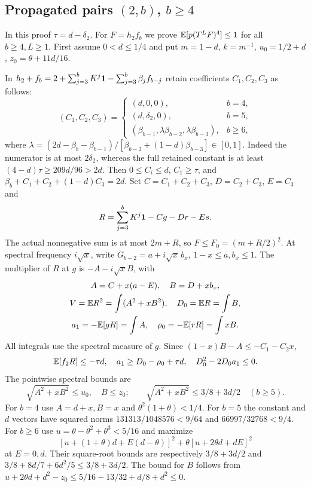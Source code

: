 \subsection[Propagated pairs (2,b), b >= 4]{Propagated pairs $(2,b)$, $b\ge4$}\label{loc:S25}\label{proof:Q4-C128}
In this proof $\tau=d-\delta_{2}$.
For $F=h_2f_b$ we prove $\mathbb E[p(T^LF)^4]\le1$ for all $b\ge4,L\ge1$.
First assume $0<d\le1/4$ and put
$m=1-d$, $k=m^{-1}$, $u_0=1/2+d$, $z_0=\theta+11d/16$.

In $h_2+f_b=2+\sum_{j=3}^bK^j\mathbf1-\sum_{j=3}^b\beta_jf_{b-j}$
retain coefficients $C_1,C_2,C_3$ as follows:
\[
 (C_1,C_2,C_3)=
 \begin{cases}(d,0,0),&b=4,\\(d,\delta_{2},0),&b=5,\\
 (\beta_{b-1},\lambda\beta_{b-2},\lambda\beta_{b-3}),&b\ge6,
 \end{cases}
\]
where $\lambda=(2d-\beta_b-\beta_{b-1})/
[\beta_{b-2}+(1-d)\beta_{b-3}]\in[0,1]$.
Indeed the numerator is at most $2\delta_{2}$, whereas the full retained
constant is at least $(4-d)\tau\ge209d/96>2d$.
Then $0\le C_i\le d$, $C_1\ge\tau$, and
$\beta_b+C_1+C_2+(1-d)C_3=2d$.
Set $C=C_1+C_2+C_3$, $D=C_2+C_3$, $E=C_3$ and
\[
 R=\sum_{j=3}^bK^j\mathbf1-Cg-Dr-Es.
\]
The actual nonnegative sum is at most $2m+R$, so
$F\le F_0=(m+R/2)^2$.
At spectral frequency $i\sqrt x$, write
$G_{b-2}=a+i\sqrt x\,b_x$, $1-x\le a,b_x\le1$.
The multiplier of $R$ at $g$ is $-A-i\sqrt xB$, with
\begin{gather*}
 A=C+x(a-E),\quad B=D+xb_x,\\
 V=\mathbb E R^2=\int(A^2+xB^2),\quad D_0=\mathbb E R=\int B,\\
 a_1=-\mathbb E[gR]=\int A,\quad\rho_0=-\mathbb E[rR]=\int xB.
\end{gather*}
All integrals use the spectral measure of $g$.
Since $(1-x)B-A\le-C_1-C_2x$,
\begin{equation}\label{eq:compact-2b-cancellation}
 \mathbb E[f_2R]\le-\tau d,\quad
 a_1\ge D_0-\rho_0+\tau d,\quad D_0^2-2D_0a_1\le0.
\end{equation}
The pointwise spectral bounds are
\[
 \sqrt{A^2+xB^2}\le u_0,\quad B\le z_0;
 \qquad \sqrt{A^2+xB^2}\le3/8+3d/2\quad(b\ge5).
\]
For $b=4$ use $A=d+x,B=x$ and
$\theta^2(1+\theta)<1/4$.
For $b=5$ the constant and $d$ vectors have squared norms
$131313/1048576<9/64$ and $66997/32768<9/4$.
For $b\ge6$ use $u=\theta-\theta^2+\theta^3<5/16$ and maximize
\[
 [u+(1+\theta)d+E(d-\theta)]^2+
                  \theta[u+2\theta d+dE]^2
\]
at $E=0,d$. Their square-root bounds are respectively
$3/8+3d/2$ and $3/8+8d/7+6d^2/5\le3/8+3d/2$.
The bound for $B$ follows from
$u+2\theta d+d^2-z_0\le5/16-13/32+d/8+d^2\le0$.

